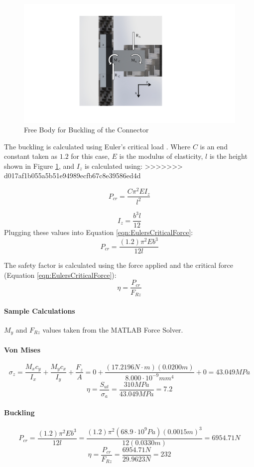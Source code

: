 \documentclass[../main.tex]{subfiles}
\begin{document}
\begin{figure}[H]
	\centering
	\includegraphics[page={2}, width=.8\linewidth]{img/analysis/arm/armConnector.pdf}
	\caption{Free Body for Buckling of the Connector}
	\label{fig:armConnectorBuck}
\end{figure}

The buckling is calculated using Euler's critical load \cite[178]{shigley}. Where $C$ is an end constant taken as $1.2$ for this case, $E$ is the modulus of elasticity, $l$ is the height shown in Figure \ref{fig:armConnectorBuck}, and $I_z$ is calculated using: 
>>>>>>> d017af1b055a5b51e94989ecfb67c8e39586ed4d

\begin{equation} \label{eqn:EulersCriticalForce}
P_{cr} = \frac{C\pi^2EI_z}{l^2}
\end{equation}

\begin{equation}
I_z = \frac{b^3l}{12}
\end{equation}
Plugging these values into Equation \ref{eqn:EulersCriticalForce}:
\begin{equation}
P_{cr} = \frac{(1.2)\pi^2Eb^3}{12l}
\end{equation}

The safety factor is calculated using the force applied and the critical force (Equation \ref{eqn:EulersCriticalForce}):
\begin{equation}
\eta = \frac{P_{cr}}{F_{Rz}}
\end{equation}

\paragraph*{Sample Calculations}
$M_y$ and $F_{Rz}$ values taken from the MATLAB Force Solver.
\paragraph*{Von Mises}
$$\sigma_{z}={\frac{M_{x}c_y}{I_x}}+{\frac{M_{y}c_x}{I_y}}+{\frac{F_z}{A}}=0+\frac{(17.2196N\cdot{}m)(0.0200m)}{8.000\cdot{}10^{-9}mm^4}+0 = 43.049MPa$$
$$\eta = \dfrac{S_{ut}}{\sigma _a} = \dfrac{310MPa}{43.049MPa}=7.2$$
\paragraph*{Buckling}
$$P_{cr} = \frac{(1.2)\pi^2Eb^3}{12l}=\frac{(1.2)\pi^2(68.9\cdot{}10^9Pa)(0.0015m)^3}{12(0.0330m)}=6954.71N$$
$$\eta = \frac{P_{cr}}{F_{Rz}} = \frac{6954.71N}{29.9623N} = 232$$
\end{document}
